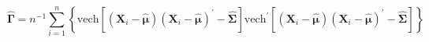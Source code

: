 \begin{equation}
    \hat{\boldsymbol{\Gamma}}
    =
    n^{-1}
    \sum_{i = 1}^{n}
    \left\{
      \mathrm{vech}
      \left[
      \left(
      \mathbf{X}_{i}
      -
      \hat{\boldsymbol{\mu}}
      \right)
      \left(
      \mathbf{X}_{i}
      -
      \hat{\boldsymbol{\mu}}
      \right)^{\prime}
      -
      \hat{\boldsymbol{\Sigma}}
      \right]
      \mathrm{vech}^{\prime}
      \left[
      \left(
      \mathbf{X}_{i}
      -
      \hat{\boldsymbol{\mu}}
      \right)
      \left(
      \mathbf{X}_{i}
      -
      \hat{\boldsymbol{\mu}}
      \right)^{\prime}
      -
      \hat{\boldsymbol{\Sigma}}
      \right]
      \right\}
    \label{eq:gammaMatrix-gammacap-gen-estimator}
\end{equation}
